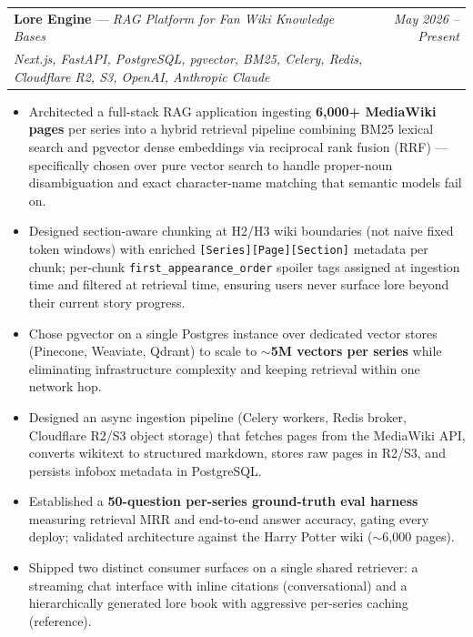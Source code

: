 \documentclass[a4paper,11pt]{article}
\makeatletter
\newcommand{\resumeProject}[4]{
\vspace{0.5mm}\item
    \begin{tabular*}{0.98\textwidth}[t]{l@{\extracolsep{\fill}}r}
        \textbf{#1} \textnormal{---} \textit{#2} & \textit{\footnotesize{#4}} \\
        \footnotesize{\textit{#3}} & \\
    \end{tabular*}
    \vspace{-2.4mm}
}
\newcommand{\resumeItemListStart}{\begin{justify}\begin{itemize}[leftmargin=3ex, rightmargin=2ex, noitemsep,labelsep=1.2mm,itemsep=0mm]\small}
\newcommand{\resumeItemListEnd}{\end{itemize}\end{justify}\vspace{-2mm}}
\makeatother
\begin{document}
    \resumeProject
      {Lore Engine}{RAG Platform for Fan Wiki Knowledge Bases}
      {Next.js, FastAPI, PostgreSQL, pgvector, BM25, Celery, Redis, Cloudflare R2, S3, OpenAI, Anthropic Claude}
      {May 2026 -- Present}
      \resumeItemListStart
        \item {Architected a full-stack RAG application ingesting \textbf{6,000+ MediaWiki pages} per series into a hybrid retrieval pipeline combining BM25 lexical search and pgvector dense embeddings via reciprocal rank fusion (RRF) — specifically chosen over pure vector search to handle proper-noun disambiguation and exact character-name matching that semantic models fail on.}
        \item {Designed section-aware chunking at H2/H3 wiki boundaries (not naive fixed token windows) with enriched \texttt{[Series][Page][Section]} metadata per chunk; per-chunk \texttt{first\_appearance\_order} spoiler tags assigned at ingestion time and filtered at retrieval time, ensuring users never surface lore beyond their current story progress.}
        \item {Chose pgvector on a single Postgres instance over dedicated vector stores (Pinecone, Weaviate, Qdrant) to scale to \textbf{$\sim$5M vectors per series} while eliminating infrastructure complexity and keeping retrieval within one network hop.}
        \item {Designed an async ingestion pipeline (Celery workers, Redis broker, Cloudflare R2/S3 object storage) that fetches pages from the MediaWiki API, converts wikitext to structured markdown, stores raw pages in R2/S3, and persists infobox metadata in PostgreSQL.}
        \item {Established a \textbf{50-question per-series ground-truth eval harness} measuring retrieval MRR and end-to-end answer accuracy, gating every deploy; validated architecture against the Harry Potter wiki ($\sim$6,000 pages).}
        \item {Shipped two distinct consumer surfaces on a single shared retriever: a streaming chat interface with inline citations (conversational) and a hierarchically generated lore book with aggressive per-series caching (reference).}
      \resumeItemListEnd
    \vspace{-2mm}
\end{document}
